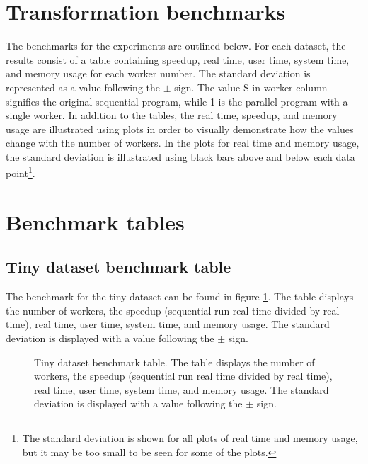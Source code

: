 

\section{Transformation benchmarks}
The benchmarks for the experiments are outlined below. For each dataset, the results consist of a table containing
speedup, real time, user time, system time, and memory usage for each worker number. The standard deviation is represented
as a value following the $\pm$ sign. The value S in worker column signifies the original sequential program, while 1 is the
parallel program with a single worker. In addition to the tables, the real time, speedup, and memory usage are illustrated
using plots in order to visually demonstrate how the values change with the number of workers. In the plots for real time
and memory usage, the standard deviation is illustrated using black bars above and below each data point\footnote{
The standard deviation is shown for all plots of real time and memory usage, but it may be too small to be seen for some of the plots.}.

\section{Benchmark tables}
\subsection{Tiny dataset benchmark table}
The benchmark for the tiny dataset can be found in figure \ref{fig:dataset_1_table}.
The table displays the number of workers, the speedup (sequential run real time divided by real time), real time,
user time, system time, and memory usage. The standard deviation is displayed with a value following the $\pm$ sign.

\begin{figure}[ht]
\centering
{}
\caption[Tiny dataset benchmark table.]{Tiny dataset benchmark table. The table displays the number of workers, the speedup (sequential run real time divided by real time), real time,
user time, system time, and memory usage. The standard deviation is displayed with a value following the $\pm$ sign.}
\label{fig:dataset_1_table}
\end{figure}

